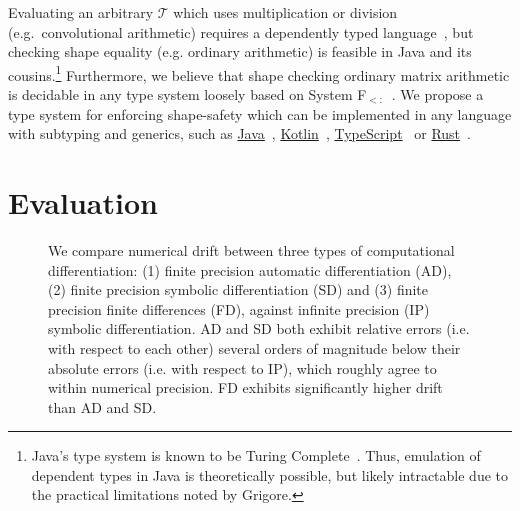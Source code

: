 \documentclass{article}
\begin{document}
Evaluating an arbitrary $\mathcal{T}$ which uses multiplication or division (e.g.\ convolutional arithmetic) requires a dependently typed language~\citep{xi1998eliminating, pineyro2019structure}, but checking shape equality (e.g. ordinary arithmetic) is feasible in Java and its cousins.\footnote{Java's type system is known to be Turing Complete~\citep{grigore2017java}. Thus, emulation of dependent types in Java is theoretically possible, but likely intractable due to the practical limitations noted by Grigore.} Furthermore, we believe that shape checking ordinary matrix arithmetic is decidable in any type system loosely based on System F${}_{<:}$~\citep{cardelli1991extension}. We propose a type system for enforcing shape-safety which can be implemented in any language with subtyping and generics, such as \href{https://docs.oracle.com/javase/tutorial/java/generics/index.html}{Java}~\citep{naftalin2007java}, \href{https://kotlinlang.org/docs/reference/generics.html}{Kotlin}~\citep{tate2013mixed}, \href{https://www.typescriptlang.org/docs/handbook/advanced-types.html}{TypeScript}~\citep{bierman2014understanding} or \href{https://doc.rust-lang.org/1.7.0/book/generics.html}{Rust}~\citep{crozet2019nalgebra}.

\section{Evaluation}
\begin{figure}
    \caption{We compare numerical drift between three types of computational differentiation: (1) finite precision automatic differentiation (AD), (2) finite precision symbolic differentiation (SD) and (3) finite precision finite differences (FD), against infinite precision (IP) symbolic differentiation. AD and SD both exhibit relative errors (i.e. with respect to each other) several orders of magnitude below their absolute errors (i.e. with respect to IP), which roughly agree to within numerical precision. FD exhibits significantly higher drift than AD and SD.}
    \label{fig:pbt_comparison}
\end{figure}
\end{document}

